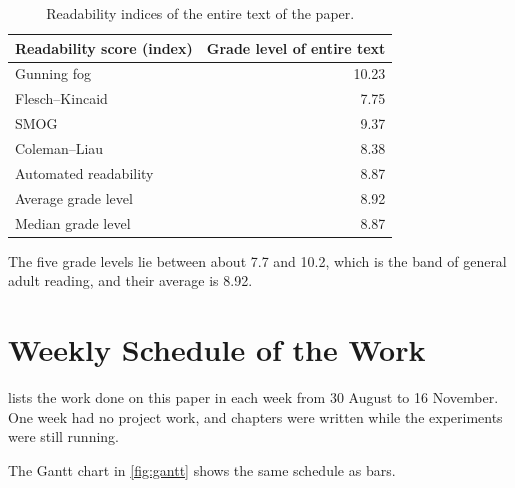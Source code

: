 \begin{table}[h]
\centering\small
\caption{Readability indices of the entire text of the paper.}
\label{tab:read}
\begin{tabular}{@{}lr@{}}
\toprule
Readability score (index) & Grade level of entire text\\
\midrule
Gunning fog & 10.23\\
Flesch--Kincaid & 7.75\\
SMOG & 9.37\\
Coleman--Liau & 8.38\\
Automated readability & 8.87\\
\midrule
Average grade level & 8.92\\
Median grade level & 8.87\\
\bottomrule
\end{tabular}
\end{table}

The five grade levels lie between about 7.7 and 10.2, which is the band of general adult reading, and their average is 8.92.

\chapter{Weekly Schedule of the Work}
\label{app:schedule}

 lists the work done on this paper in each week from 30 August to 16 November. One week had no project work, and chapters were written while the experiments were still running.

The Gantt chart in \cref{fig:gantt} shows the same schedule as bars.

